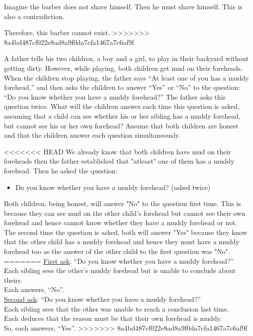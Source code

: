 \documentclass[a4paper]{exam}
\begin{document}
\begin{questions}
\begin{solution}
    Imagine the barber does not shave himself. Then he must shave himself. This is also a contradiction.

    Therefore, this barber cannot exist.
>>>>>>> 8a4bd487cf022e8ad8a9f0da7cfa1467a7c6af9f
  \end{solution}
  
  \question A father tells his two children, a boy and a girl, to play in their backyard without getting dirty. However, while playing, both children get mud on their foreheads. When the children stop playing, the father says ``At least one of you has a muddy forehead,'' and then asks the children to answer ``Yes'' or ``No'' to the question: ``Do you know whether you have a muddy forehead?'' The father asks this question twice. What will the children answer each time this question is asked, assuming that a child can see whether his or her sibling has a muddy forehead, but cannot see his or her own forehead? Assume that both children are honest and that the children answer each question simultaneously.
  \begin{solution}
<<<<<<< HEAD
    We already know that both children have mud on their foreheads then the father established that "atleast" one of them has a muddy forehead. Then he asked the question:
    \begin{itemize}
      \item Do you know whether you have a muddy forehead? (asked twice)
    \end{itemize}
    Both children, being honest, will answer "No" to the question first time. This is because they can see mud on the other child's forehead but cannot see their own forehead and hence cannot know whether they have a muddy forehead or not. The second time the question is asked, both will answer "Yes" because they know that the other child has a muddy forehead and hence they must have a muddy forehead too as the answer of the other child to the first question was "No".
=======
    \underline{First ask}: ``Do you know whether you have a muddy forehead?''\\
    Each sibling sees the other's muddy forehead but is unable to conclude about theirs.\\
    Each answers, ``No''.\\
    \underline{Second ask}: ``Do you know whether you have a muddy forehead?''\\
    Each sibling sees that the other was unable to reach a conclusion last time.\\
    Each deduces that the reason must be that their own forehead is muddy.\\
    So, each answers, ``Yes''.
>>>>>>> 8a4bd487cf022e8ad8a9f0da7cfa1467a7c6af9f
  \end{solution}
  

\end{questions}
\end{document}
